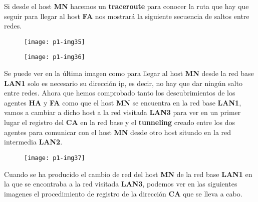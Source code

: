 \documentclass[10pt]{article}
\begin{document}
Si desde el host \textbf{MN} hacemos un \textbf{traceroute} para conocer la ruta que hay que seguir para llegar al host \textbf{FA} nos mostrará la siguiente secuencia de saltos entre redes.\\

\begin{figure}[H]
	\begin{center}
 		\texttt{[image: p1-img35]}
	\end{center} 
\end{figure}

\begin{figure}[H]
	\begin{center}
 		\texttt{[image: p1-img36]}
	\end{center} 
\end{figure}

Se puede ver en la última imagen como para llegar al host \textbf{MN} desde la red base \textbf{LAN1} solo es necesario su dirección ip, es decir, no hay que dar ningún salto entre redes.  Ahora que hemos comprobado tanto los descubrimientos de los agentes \textbf{HA} y \textbf{FA} como que el host \textbf{MN} se encuentra en la red base \textbf{LAN1}, vamos a cambiar a dicho host a la red visitada \textbf{LAN3} para ver en un primer lugar el registro del \textbf{CA} en la red base y el \textbf{tunneling} creado entre los dos agentes para comunicar con el host \textbf{MN} desde otro host situado en la red intermedia \textbf{LAN2}.\\

\begin{figure}[H]
	\begin{center}
 		\texttt{[image: p1-img37]}
	\end{center} 
\end{figure}

Cuando se ha producido el cambio de red del host \textbf{MN} de la red base \textbf{LAN1} en la que se encontraba a la red visitada \textbf{LAN3}, podemos ver en las siguientes imagenes el procedimiento de registro de la dirección \textbf{CA} que se lleva a cabo. \\
\end{document}
